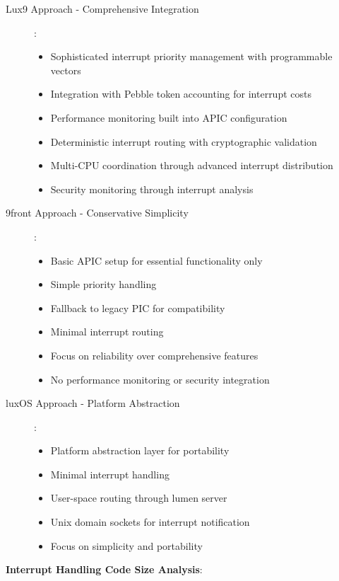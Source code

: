 \documentclass[11pt,letterpaper]{article}
\begin{document}
\begin{description}
\item[Lux9 Approach - Comprehensive Integration]:
  \begin{itemize}
  \item Sophisticated interrupt priority management with programmable vectors
  \item Integration with Pebble token accounting for interrupt costs
  \item Performance monitoring built into APIC configuration
  \item Deterministic interrupt routing with cryptographic validation
  \item Multi-CPU coordination through advanced interrupt distribution
  \item Security monitoring through interrupt analysis
  \end{itemize}

\item[9front Approach - Conservative Simplicity]:
  \begin{itemize}
  \item Basic APIC setup for essential functionality only
  \item Simple priority handling
  \item Fallback to legacy PIC for compatibility
  \item Minimal interrupt routing
  \item Focus on reliability over comprehensive features
  \item No performance monitoring or security integration
  \end{itemize}

\item[luxOS Approach - Platform Abstraction]:
  \begin{itemize}
  \item Platform abstraction layer for portability
  \item Minimal interrupt handling
  \item User-space routing through lumen server
  \item Unix domain sockets for interrupt notification
  \item Focus on simplicity and portability
  \end{itemize}
\end{description}

\textbf{Interrupt Handling Code Size Analysis}:
\end{document}
